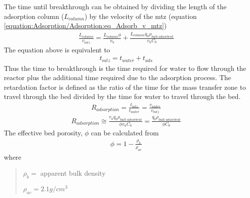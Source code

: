 \documentclass[letterpaper,10pt,english]{sphinxmanual}
\begin{document}
The time until breakthrough can be obtained by dividing the length of the adsorption column (\(L_{column}\)) by the velocity of the mtz (equation \eqref{equation:Adsorption/Adsorption:eq_Adsorb_v_mtz})
\begin{equation}\label{equation:Adsorption/Adsorption:Adsorption/Adsorption:4}
\begin{split}\frac{L_{column}}{v_{mtz}} = \frac{L_{column}\phi}{v_a} + \frac{L_{column}q_0 \rho_{bulk \; adsorbent}}{v_a C_0}\end{split}
\end{equation}
The equation above is equivalent to
\begin{equation}\label{equation:Adsorption/Adsorption:Adsorption/Adsorption:5}
\begin{split}t_{mtz} = t_{water} + t_{ads}\end{split}
\end{equation}
Thus the time to breakthrough is the time required for water to flow through the reactor plus the additional time required due to the adsorption process. The retardation factor is defined as the ratio of the time for the mass transfer zone to travel through the bed divided by the time for water to travel through the bed.
\begin{equation}\label{equation:Adsorption/Adsorption:eq_R_adsorption_}
\begin{split}R_{adsorption} = \frac{t_{mtz}}{t_{water}} = \frac{v_{water}}{v_{mtz}}\end{split}
\end{equation}\begin{equation}\label{equation:Adsorption/Adsorption:Adsorption/Adsorption:6}
\begin{split}R_{adsorption}\cong  \frac{v_a q_0 \rho_{bulk \; adsorbent}}{\phi v_a C_0} =\frac{q_0 \rho_{bulk \; adsorbent}}{\phi C_0}\end{split}
\end{equation}
The effective bed porosity, \(\phi\) can be calculated from
\begin{equation}\label{equation:Adsorption/Adsorption:Adsorption/Adsorption:7}
\begin{split}\phi =1-\frac{\rho _b }{\rho _{ac} }\end{split}
\end{equation}
where
\begin{quote}

\begin{DUlineblock}{0em}
\item[] \(\rho_b =\) apparent bulk density
\item[] \(\rho_{ac}  =  2.1 g/cm^3\)
\end{DUlineblock}
\end{quote}
\end{document}

